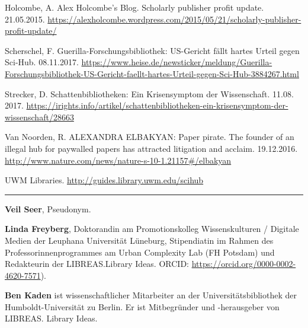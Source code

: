 \documentclass[a4paper,
fontsize=11pt,
oneside,
numbers=noperiodatend,
parskip=half-,
bibliography=totoc,
final
]{scrartcl}
\begin{document}
Holcombe, A. Alex Holcombe's Blog. Scholarly publisher profit update.
21.05.2015.
\url{https://alexholcombe.wordpress.com/2015/05/21/scholarly-publisher-profit-update/}

Scherschel, F. Guerilla-Forschungsbibliothek: US-Gericht fällt hartes
Urteil gegen Sci-Hub. 08.11.2017.
\url{https://www.heise.de/newsticker/meldung/Guerilla-Forschungsbibliothek-US-Gericht-faellt-hartes-Urteil-gegen-Sci-Hub-3884267.html}

Strecker, D. Schattenbibliotheken: Ein Krisensymptom der Wissenschaft.
11.08. 2017.
\url{https://irights.info/artikel/schattenbibliotheken-ein-krisensymptom-der-wissenschaft/28663}

Van Noorden, R. ALEXANDRA ELBAKYAN: Paper pirate. The founder of an
illegal hub for paywalled papers has attracted litigation and acclaim.
19.12.2016.
\url{http://www.nature.com/news/nature-s-10-1.21157\#/elbakyan}

UWM Libraries. \url{http://guides.library.uwm.edu/scihub}

\begin{center}\rule{0.5\linewidth}{\linethickness}\end{center}

\textbf{Veil Seer}, Pseudonym.

\textbf{Linda Freyberg}, Doktorandin am Promotionskolleg Wissenskulturen
/ Digitale Medien der Leuphana Universität Lüneburg, Stipendiatin im
Rahmen des Professorinnenprogrammes am Urban Complexity Lab (FH Potsdam)
und Redakteurin der LIBREAS.Library Ideas. ORCID:
\url{https://orcid.org/0000-0002-4620-7571}).

\textbf{Ben Kaden} ist wissenschaftlicher Mitarbeiter an der
Universitätsbibliothek der Hum\-boldt-Uni\-ver\-si\-tät zu Berlin. Er ist
Mitbegründer und -herausgeber von LIBREAS. Library Ideas.
\end{document}
